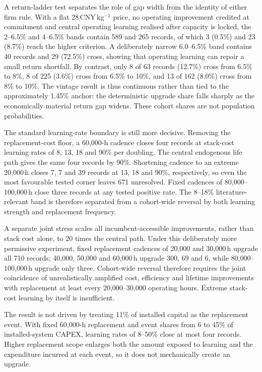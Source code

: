 \documentclass[pdflatex,sn-nature]{sn-jnl}
\begin{document}
A return-ladder test separates the role of gap width from the identity of either firm rule. With a flat 28\,CNY\,kg$^{-1}$ price, no operating improvement credited at commitment and central operating learning realised after capacity is locked, the 2--6.5\% and 4--6.5\% bands contain 589 and 265 records, of which 3 (0.5\%) and 23 (8.7\%) reach the higher criterion. A deliberately narrow 6.0--6.5\% band contains 40 records and 29 (72.5\%) cross, showing that operating learning can repair a small return shortfall. By contrast, only 8 of 63 records (12.7\%) cross from 6.5\% to 8\%, 8 of 225 (3.6\%) cross from 6.5\% to 10\%, and 13 of 162 (8.0\%) cross from 8\% to 10\%. The vintage result is thus continuous rather than tied to the approximately 1.45\% anchor: the deterministic upgrade share falls sharply as the economically material return gap widens. These cohort shares are not population probabilities.

The standard learning-rate boundary is still more decisive. Removing the replacement-cost floor, a 60,000-h cadence closes four records at stack-cost learning rates of 8, 13, 18 and 90\% per doubling. The central endogenous life path gives the same four records by 90\%. Shortening cadence to an extreme 20,000\,h closes 7, 7 and 39 records at 13, 18 and 90\%, respectively, so even the most favourable tested corner leaves 671 unresolved. Fixed cadences of 80,000--100,000\,h close three records at any tested positive rate. The 8--18\% literature-relevant band is therefore separated from a cohort-wide reversal by both learning strength and replacement frequency.

A separate joint stress scales all incumbent-accessible improvements, rather than stack cost alone, to 20 times the central path. Under this deliberately more permissive experiment, fixed replacement cadences of 20,000 and 30,000\,h upgrade all 710 records; 40,000, 50,000 and 60,000\,h upgrade 300, 69 and 6, while 80,000--100,000\,h upgrade only three. Cohort-wide reversal therefore requires the joint coincidence of unrealistically amplified cost, efficiency and lifetime improvements with replacement at least every 20,000--30,000 operating hours. Extreme stack-cost learning by itself is insufficient.

The result is not driven by treating 11\% of installed capital as the replacement event. With fixed 60,000-h replacement and event shares from 6 to 45\% of installed-system CAPEX, learning rates of 8--50\% close at most four records. Higher replacement scope enlarges both the amount exposed to learning and the expenditure incurred at each event, so it does not mechanically create an upgrade.
\end{document}
